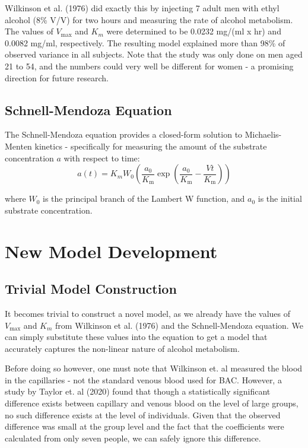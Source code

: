 \documentclass[12pt]{article}
\begin{document}
Wilkinson et al. (1976) did exactly this by injecting 7 adult men with ethyl alcohol (8\% V/V) for two hours and measuring the rate of alcohol metabolism. The values of $V_{\text{max}}$ and $K_m$ were determined to be 0.0232 mg/(ml x hr) and 0.0082 mg/ml, respectively. The resulting model explained more than 98\% of observed variance in all subjects. Note that the study was only done on men aged 21 to 54, and the numbers could very well be different for women - a promising direction for future research.

\subsection{Schnell-Mendoza Equation}

The Schnell-Mendoza equation provides a closed-form solution to Michaelis-Menten kinetics - specifically for measuring the amount of the substrate concentration $a$ with respect to time: 
\[
a(t) = K_mW_0({\displaystyle{\frac {a_{0}}{K_{\mathrm {m} }}}\exp \!\left({\frac {a_{0}}{K_{\mathrm {m} }}}-{\frac {Vt}{K_{\mathrm {m} }}}\right)})
\]

where $W_0$ is the principal branch of the Lambert W function, and $a_0$ is the initial substrate concentration.

\section{New Model Development}
\subsection{Trivial Model Construction}

It becomes trivial to construct a novel model, as we already have the values of $V_{\text{max}}$ and $K_m$ from Wilkinson et al. (1976) and the Schnell-Mendoza equation. We can simply substitute these values into the equation to get a model that accurately captures the non-linear nature of alcohol metabolism.

Before doing so however, one must note that Wilkinson et. al measured the blood in the capillaries - not the standard venous blood used for BAC. However, a study by Taylor et. al (2020) found that though a statistically significant difference exists between capillary and venous blood on the level of large groups, no such difference exists at the level of individuals. Given that the observed difference was small at the group level and the fact that the coefficients were calculated from only seven people, we can safely ignore this difference.
\end{document}
